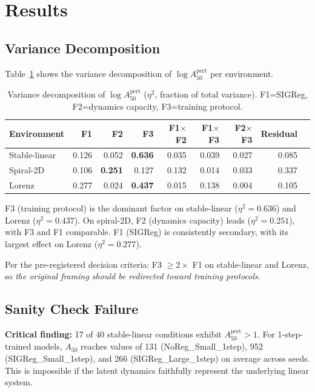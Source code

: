 \documentclass{article}
\begin{document}
\section{Results}

\subsection{Variance Decomposition}

Table~\ref{tab:anova} shows the variance decomposition of $\log A_{50}^{\text{pert}}$ per environment.

\begin{table}[h]
\centering
\caption{Variance decomposition of $\log A_{50}^{\text{pert}}$ ($\eta^2$, fraction of total variance).
F1=SIGReg, F2=dynamics capacity, F3=training protocol.}
\label{tab:anova}
\small
\begin{tabular}{lrrrrrrrr}
\toprule
Environment & F1 & F2 & F3 & F1$\times$F2 & F1$\times$F3 & F2$\times$F3 & Residual \\
\midrule
Stable-linear & 0.126 & 0.052 & \textbf{0.636} & 0.035 & 0.039 & 0.027 & 0.085 \\
Spiral-2D     & 0.106 & \textbf{0.251} & 0.127 & 0.132 & 0.014 & 0.033 & 0.337 \\
Lorenz        & 0.277 & 0.024 & \textbf{0.437} & 0.015 & 0.138 & 0.004 & 0.105 \\
\bottomrule
\end{tabular}
\end{table}

F3 (training protocol) is the dominant factor on stable-linear ($\eta^2 = 0.636$) and Lorenz ($\eta^2 = 0.437$).
On spiral-2D, F2 (dynamics capacity) leads ($\eta^2 = 0.251$), with F3 and F1 comparable.
F1 (SIGReg) is consistently secondary, with its largest effect on Lorenz ($\eta^2 = 0.277$).

Per the pre-registered decision criteria: F3 $\geq 2\times$ F1 on stable-linear and Lorenz,
so \emph{the original framing should be redirected toward training protocols}.

\subsection{Sanity Check Failure}

\textbf{Critical finding:} 17 of 40 stable-linear conditions exhibit $A_{50}^{\text{pert}} > 1$.
For 1-step-trained models, $A_{50}$ reaches values of 131 (NoReg\_Small\_1step),
952 (SIGReg\_Small\_1step), and 266 (SIGReg\_Large\_1step) on average across seeds.
This is impossible if the latent dynamics faithfully represent the underlying linear system.
\end{document}
